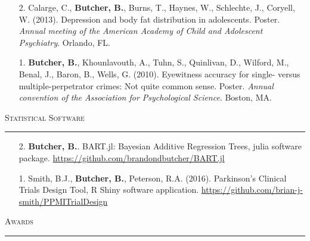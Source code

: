 \documentclass[a4paper]{article}
\begin{document}
\begin{enumerate}
  \item[2.] Calarge, C., \textbf{Butcher, B.}, Burns, T., Haynes, W., Schlechte,
    J., Coryell, W. (2013). Depression and body fat distribution in adolescents.
    Poster. \textit{Annual meeting of the American Academy of Child and Adolescent
    Psychiatry}. Orlando, FL.

  \item[1.] \textbf{Butcher, B.}, Khounlavouth, A., Tuhn, S., Quinlivan, D.,
    Wilford, M., Benal, J., Baron, B., Wells, G. (2010). Eyewitness accuracy for
    single- versus multiple-perpetrator crimes: Not quite common sense. Poster.
    \textit{Annual convention of the Association for Psychological Science}.
    Boston, MA.

\end{enumerate}


\begin{flushleft}
  \Large\textsc{Statistical Software}
  \textcolor{usafagrey}{\rule[0.5\baselineskip]{\textwidth}{0.75pt}}
\end{flushleft}
\vspace{-1.5\baselineskip}

\begin{enumerate}
  \item[2.] \textbf{Butcher, B.}. BART.jl: Bayesian
    Additive Regression Trees, julia software package.
    \url{https://github.com/brandondbutcher/BART.jl}
  \item[1.] Smith, B.J., \textbf{Butcher, B.}, Peterson, R.A. (2016).
    Parkinson's Clinical Trials Design Tool, R Shiny software application.
    \url{https://github.com/brian-j-smith/PPMITrialDesign}
\end{enumerate}


\begin{flushleft}
  \Large\textsc{Awards}
  \textcolor{usafagrey}{\rule[0.5\baselineskip]{\textwidth}{0.75pt}}
\end{flushleft}
\vspace{-\baselineskip}
\end{document}
